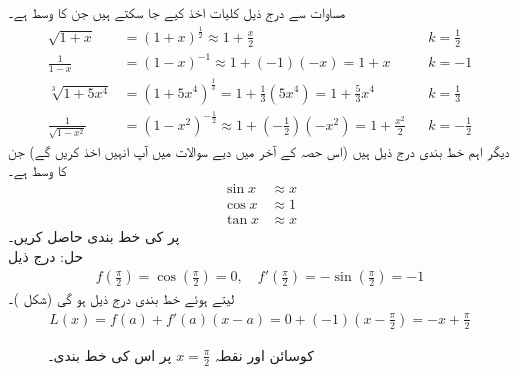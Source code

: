 مساوات  سے درج ذیل کلیات اخذ کیے جا سکتے ہیں جن کا وسط  ہے۔
\begin{align*}
\sqrt{1+x}&=(1+x)^{\tfrac{1}{2}}\approx 1+\frac{x}{2}&& k=\frac{1}{2}\\
\frac{1}{1-x}&=(1-x)^{-1}\approx 1+(-1)(-x)=1+x&&k=-1\\
\sqrt[3]{1+5x^4}&=(1+5x^4)^{\tfrac{1}{3}}=1+\frac{1}{3}(5x^4)=1+\frac{5}{3}x^4&&k=\frac{1}{3}\\
\frac{1}{\sqrt{1-x^2}}&=(1-x^2)^{-\tfrac{1}{2}}\approx 1+(-\tfrac{1}{2})(-x^2)=1+\frac{x^2}{2}&&k=-\frac{1}{2}
\end{align*}
دیگر اہم خط بندی درج ذیل ہیں (اس حصہ کے آخر میں دیے سوالات میں  آپ انہیں اخذ کریں گے) جن کا وسط  ہے۔
\begin{align*}
\sin x&\approx x\\
\cos x&\approx 1\\
\tan x&\approx x
\end{align*}
 پر  کی خط بندی حاصل کریں۔\\
حل:\quad
درج ذیل
\begin{align*}
f(\tfrac{\pi}{2})=\cos(\tfrac{\pi}{2})=0,\quad f'(\tfrac{\pi}{2})=-\sin(\tfrac{\pi}{2})=-1
\end{align*}
لیتے ہوئے خط بندی درج ذیل ہو گی (شکل )۔
\begin{align*}
L(x)=f(a)+f'(a)(x-a)=0+(-1)(x-\tfrac{\pi}{2})=-x+\tfrac{\pi}{2}
\end{align*}
\begin{figure}
\centering
{}
\caption{کوسائن اور نقطہ $x=\tfrac{\pi}{2}$ پر اس کی خط بندی۔}
\label{شکل_مثال_استعمال_خطی_تخمین_کوسائن}
\end{figure}

